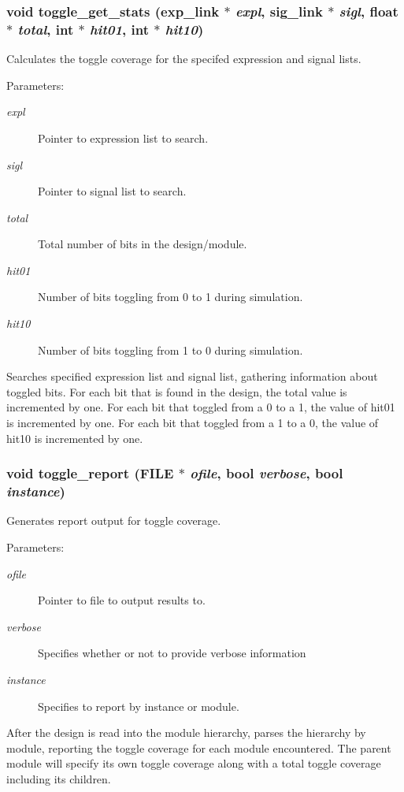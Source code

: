 \subsubsection{\setlength{\rightskip}{0pt plus 5cm}void toggle\_\-get\_\-stats ({\bf exp\_\-link} $\ast$ {\em expl}, {\bf sig\_\-link} $\ast$ {\em sigl}, float $\ast$ {\em total}, int $\ast$ {\em hit01}, int $\ast$ {\em hit10})}\label{toggle_8h_a0}


Calculates the toggle coverage for the specifed expression and signal lists.

\begin{Desc}
\item[Parameters: ]\par
\begin{description}
\item[{\em 
expl}]Pointer to expression list to search. \item[{\em 
sigl}]Pointer to signal list to search. \item[{\em 
total}]Total number of bits in the design/module. \item[{\em 
hit01}]Number of bits toggling from 0 to 1 during simulation. \item[{\em 
hit10}]Number of bits toggling from 1 to 0 during simulation.\end{description}
\end{Desc}
Searches specified expression list and signal list, gathering information  about toggled bits. For each bit that is found in the design, the total value is incremented by one. For each bit that toggled from a 0 to a 1, the value of hit01 is incremented by one. For each bit that toggled from a 1 to a 0, the value of hit10 is incremented by one. 
\subsubsection{\setlength{\rightskip}{0pt plus 5cm}void toggle\_\-report (FILE $\ast$ {\em ofile}, {\bf bool} {\em verbose}, {\bf bool} {\em instance})}\label{toggle_8h_a1}


Generates report output for toggle coverage.

\begin{Desc}
\item[Parameters: ]\par
\begin{description}
\item[{\em 
ofile}]Pointer to file to output results to. \item[{\em 
verbose}]Specifies whether or not to provide verbose information \item[{\em 
instance}]Specifies to report by instance or module.\end{description}
\end{Desc}
After the design is read into the module hierarchy, parses the hierarchy by module, reporting the toggle coverage for each module encountered. The parent module will specify its own toggle coverage along with a total toggle coverage including its  children. 